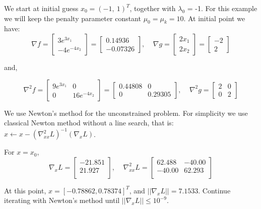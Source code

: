 \documentclass [11point]{article}
\begin{document}
We start at initial guess $x_0 = (-1,~1)^T$, together with $\lambda_0$ = -1. For this example we will keep the penalty parameter constant $\mu_0 = \mu_k = 10$.
At initial point we have:
\begin{equation*}
\nabla f = \begin{bmatrix}  3 e^{3 x_1} \\ -4 e^{-4 x_2} \end{bmatrix} =
\begin{bmatrix}   0.14936 \\ -0.07326 \end{bmatrix},~~~~~
\nabla g = \begin{bmatrix}  2 x_1 \\ 2 x_2 \end{bmatrix} = \begin{bmatrix}   -2 \\ 2  \end{bmatrix}
\end{equation*}

and,

\begin{equation*}
\nabla^2 f = \begin{bmatrix}  9 e^{3 x_1} & 0 \\ 0 & 16 e^{-4 x_2} \end{bmatrix} =
\begin{bmatrix}   0.44808 & 0 \\ 0 & 0.29305 \end{bmatrix}, ~~~~~
\nabla^2 g = \begin{bmatrix}  2 & 0 \\ 0 & 2 \end{bmatrix}
\end{equation*}

We use Newton’s method for the unconstrained problem. For simplicity we use classical Newton method without a line search, that is: $x \leftarrow x - (\nabla_{xx}^2 L)^{-1} (\nabla_x L)$.

For $x = x_0$, $$\nabla_x L = \begin{bmatrix} -21.851 \\ 21.927 \\ \end{bmatrix}, ~~~~~
\nabla_{xx}^2 L =  \begin{bmatrix}  62.488 & -40.00  \\ -40.00 & 62.293 \\ \end{bmatrix}$$

At this point, $x = [-0.78862, 0.78374]^T$, and $||\nabla_x L ||=7.1533$. Continue iterating with Newton’s method until $||\nabla_x L || \leq 10^{-9}$.
\end{document}
